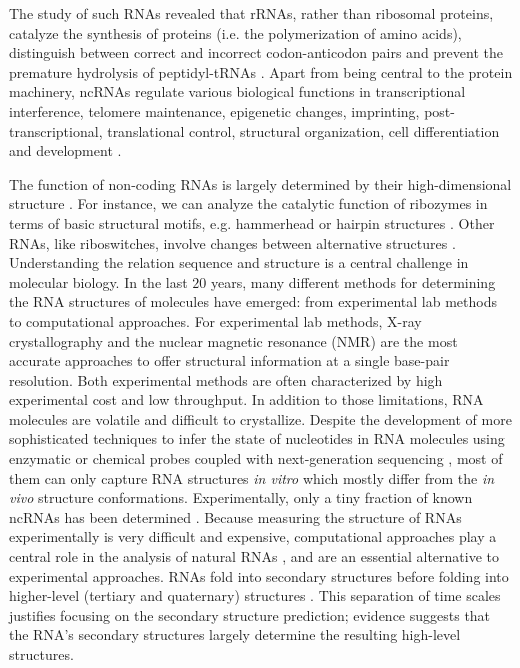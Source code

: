 The study of such RNAs revealed that rRNAs, rather than ribosomal proteins, catalyze the synthesis of proteins (i.e. the polymerization of amino acids), distinguish between correct and incorrect codon-anticodon pairs and prevent the premature hydrolysis of peptidyl-tRNAs \cite{moore2011roles, breaker2006rna}. Apart from being central to the protein machinery, ncRNAs regulate various biological functions in transcriptional interference, telomere maintenance, epigenetic changes, imprinting, post-transcriptional, translational control, structural organization, cell differentiation and development \cite{fatica2014long,santosh2015non}. 

The function of non-coding RNAs is largely determined by their high-dimensional structure \cite{cech2014noncoding}. For instance, we can analyze the catalytic function of ribozymes in terms of basic structural motifs, e.g. hammerhead or hairpin structures \cite{doherty2001ribozyme}. Other RNAs, like riboswitches, involve changes between alternative structures  \cite{vitreschak04_ribos}. Understanding the relation sequence and structure is a central challenge in molecular biology. In the last $20$ years, many different methods for determining the RNA structures of molecules have emerged: from experimental lab methods to computational approaches. For experimental lab methods, X-ray crystallography and the nuclear magnetic resonance (NMR)  are the most accurate approaches to offer structural information at a single base-pair resolution. Both experimental methods are often characterized by high experimental cost and low throughput. In addition to those limitations, RNA molecules are volatile and difficult to crystallize. Despite the development of more sophisticated techniques to infer the state of nucleotides in RNA molecules using enzymatic \cite{kertesz2010genome, underwood2010fragseq} or chemical probes \cite{tijerina2007dms, wilkinson2006selective} coupled with next-generation sequencing \cite{bevilacqua2016genome, tian2016rna}, most of them can only capture RNA structures \textit{in vitro} which mostly differ from the \textit{in vivo} structure conformations. Experimentally, only a tiny fraction of known ncRNAs has been determined \cite{rnacentral2017rnacentral}. Because measuring the structure of RNAs experimentally is very difficult and expensive, computational approaches play a central role in the analysis of natural RNAs \cite{seetin2012rna, fallmann2017recent}, and are an essential alternative to experimental approaches. RNAs fold into secondary structures before folding into higher-level (tertiary and quaternary) structures \cite{brion1997hierarchy,tinoco1999rna}. This separation of time scales justifies focusing on the secondary structure prediction; evidence suggests that the RNA's secondary structures largely determine the resulting high-level structures. 

